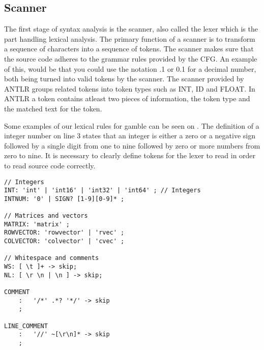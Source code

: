 \subsection{Scanner}
The first stage of syntax analysis is the scanner, also called the lexer which is the part handling lexical analysis.
The primary function of a scanner is to transform a sequence of characters into a sequence of tokens.
The scanner makes sure that the source code adheres to the grammar rules provided by the CFG.
An example of this, would be that you could use the notation .1 or 0.1 for a decimal number, both being turned into valid tokens by the scanner.
The scanner provided by ANTLR groups related tokens into token types such as INT, ID and FLOAT.
In ANTLR a token contains atleast two pieces of information, the token type and the matched text for the token.

Some examples of our lexical rules for \gls{gamble} can be seen on .
The definition of a integer number on line 3 states that an integer is either a zero or a negative sign followed by a single digit from one to nine followed by zero or more numbers from zero to nine.
It is necessary to clearly define tokens for the lexer to read in order to read source code correctly. \citep{Crafting_book}

\begin{lstlisting}[caption=Example of our lexer rules for ANTLR4,frame=tlrb,label={lst:token}]
// Integers
INT: 'int' | 'int16' | 'int32' | 'int64' ; // Integers
INTNUM: '0' | SIGN? [1-9][0-9]* ;

// Matrices and vectors
MATRIX: 'matrix' ;
ROWVECTOR: 'rowvector' | 'rvec' ;
COLVECTOR: 'colvector' | 'cvec' ;  

// Whitespace and comments
WS: [ \t ]+ -> skip;
NL: [ \r \n | \n ] -> skip;

COMMENT
    :   '/*' .*? '*/' -> skip
    ;

LINE_COMMENT
    :   '//' ~[\r\n]* -> skip
    ;
\end{lstlisting}